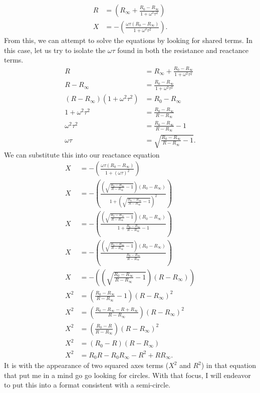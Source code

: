 \documentclass[11pt]{book}
\begin{document}
\begin{align}
	R &= \left(R_{\infty} + \frac{R_0 - R_{\infty}}{1 + \omega^2 \tau^2}\right) \\
	X &= - \left(\frac{\omega \tau (R_0 - R_{\infty})}{1 + \omega^2 \tau^2}\right).
\end{align}
From this, we can attempt to solve the equations by looking for shared terms. In this case, let us try to isolate the $\omega\tau$ found in both the resistance and reactance terms.
\begin{align}
	R &= R_{\infty} + \frac{R_0 - R_{\infty}}{1 + \omega^2 \tau^2} \\
	R - R_{\infty} &= \frac{R_0 - R_{\infty}}{1 + \omega^2 \tau^2} \\
	(R - R_{\infty})(1 + \omega^2 \tau^2) &= R_0 - R_{\infty} \\
	1 + \omega^2 \tau^2 &= \frac{R_0 - R_{\infty}}{R - R_{\infty}} \\
	\omega^2 \tau^2 &= \frac{R_0 - R_{\infty}}{R - R_{\infty}}  - 1 \\
	\omega \tau &= \sqrt{\frac{R_0 - R_{\infty}}{R - R_{\infty}}  - 1}.
\end{align}
We can substitute this into our reactance equation
\begin{align}
	X &= - \left(\frac{\omega \tau (R_0 - R_{\infty})}{1 + (\omega \tau)^2}\right) \\
	X &= - \left(\frac{\left(\sqrt{\frac{R_0 - R_{\infty}}{R - R_{\infty}}  - 1}\right) (R_0 - R_{\infty})}{1 + \left(\sqrt{\frac{R_0 - R_{\infty}}{R - R_{\infty}}  - 1}\right)^2}\right) \\
	X &= - \left(\frac{\left(\sqrt{\frac{R_0 - R_{\infty}}{R - R_{\infty}}  - 1}\right) (R_0 - R_{\infty})}{1 + \frac{R_0 - R_{\infty}}{R - R_{\infty}}  - 1}\right) \\
	X &= - \left(\frac{\left(\sqrt{\frac{R_0 - R_{\infty}}{R - R_{\infty}}  - 1}\right) (R_0 - R_{\infty})}{\frac{R_0 - R_{\infty}}{R - R_{\infty}}}\right) \\
	X &= - \left(\left(\sqrt{\frac{R_0 - R_{\infty}}{R - R_{\infty}}  - 1}\right) (R - R_{\infty}) \right) \\
	X^2 &= \left(\frac{R_0 - R_{\infty}}{R - R_{\infty}}  - 1\right) (R - R_{\infty})^2 \\
	X^2 &= \left(\frac{R_0 - R_{\infty} - R + R_{\infty}}{R - R_{\infty}}\right) (R - R_{\infty})^2 \\
	X^2 &= \left(\frac{R_0 - R }{R - R_{\infty}}\right) (R - R_{\infty})^2 \\
	X^2 &= \left(R_0 - R \right) (R - R_{\infty}) \\
	X^2 &= R_0R - R_0R_{\infty} - R^2 + R R_{\infty}.
\end{align}
It is with the appearance of two squared axes terms ($X^2$ and $R^2$) in that equation that put me in a mind go go looking for circles. With that focus, I will endeavor to put this into a format consistent with a semi-circle.
\end{document}
